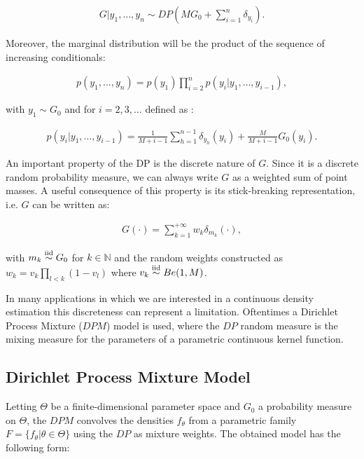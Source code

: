 \begin{align}
	G | y_1,\dots,y_n \sim DP(M G_0 + \sum_{i=1}^n \delta_{y_i}) .
\end{align}

Moreover, the marginal distribution will be the product of the sequence of increasing conditionals:

\begin{align}
	p(y_1,\dots,y_n)= p(y_1)\prod\limits_{i=2}^{n} p(y_i|y_1,\dots,y_{i-1}),
\end{align}

with $y_1 \sim G_0$ and for $i=2,3,\dots$ defined as :

\begin{align}
	p(y_i|y_1,\dots,y_{i-1})= \frac{1}{M+i-1}\sum_{h=1}^{n-1} \delta_{y_h}(y_i) +\frac{M}{M+i-1} G_0(y_i).
\end{align}

An important property of the DP is the discrete nature of $G$. Since it is a discrete
random probability measure, we can always write $G$ as a weighted sum of point masses.
A useful consequence of this property is its stick-breaking representation, i.e. $G$ can be written as:

\begin{align}
 G(\cdot) = \sum_{k=1}^{+\infty} w_k \delta_{m_k} (\cdot),
 \end{align}
 
with $m_k \stackrel{\text{iid}}{\sim} G_0$ for $k\in\mathbb{N}$ and the random weights constructed as $w_k =v_k\prod\limits_{l<k} (1-v_l)$ where $v_k \stackrel{\text{iid}}{\sim} Be(1,M)$.




In many applications in which we are interested in a continuous density estimation this discreteness can represent a limitation.
 Oftentimes a Dirichlet Process Mixture ($DPM$) model is used, where  the $DP$ random measure is the mixing measure for the parameters of a parametric continuous kernel function.


\subsection{Dirichlet Process Mixture Model}


Letting $\Theta$ be a finite-dimensional parameter space and $G_0$ a probability measure on $\Theta$, the $DPM$ convolves the densities $f_\theta$ from a parametric family $F =\{f_\theta| \theta \in \Theta \}$ using the $DP$ as mixture weights. The obtained model has the following form:

